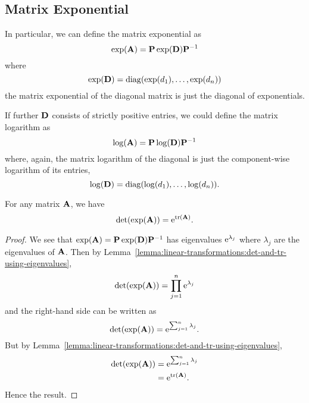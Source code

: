 \subsection{Matrix Exponential}

In particular, we can define the matrix exponential as
\begin{equation}
\exp(\mathbf{A}) = \mathbf{P}\exp(\mathbf{D})\mathbf{P}^{-1}
\end{equation}
where
\begin{equation}
\exp(\mathbf{D}) = \operatorname{diag}(\exp(d_{1}), \dots, \exp(d_{n}))
\end{equation}
the matrix exponential of the diagonal matrix is just the diagonal of
exponentials.

If further $\mathbf{D}$ consists of strictly positive entries, we could
define the matrix logarithm as
\begin{equation}
\log(\mathbf{A}) = \mathbf{P}\log(\mathbf{D})\mathbf{P}^{-1}
\end{equation}
where, again, the matrix logarithm of the diagonal is just the
component-wise logarithm of its entries,
\begin{equation}
\log(\mathbf{D}) = \operatorname{diag}(\log(d_{1}), \dots, \log(d_{n})).
\end{equation}


\begin{theorem}
  For any matrix $\mathbf{A}$, we have
  \begin{equation}
\det(\exp(\mathbf{A})) = \mathrm{e}^{\mathop{\rm tr}\nolimits(\mathbf{A})}.
  \end{equation}
\end{theorem}
\begin{proof}
We see that $\exp(\mathbf{A})=\mathbf{P}\exp(\mathbf{D})\mathbf{P}^{-1}$ has
eigenvalues $\mathrm{e}^{\lambda_{j}}$ where $\lambda_{j}$ are the eigenvalues
of $\mathbf{A}$. Then by Lemma~\ref{lemma:linear-transformations:det-and-tr-using-eigenvalues},
\begin{equation}
\det(\exp(\mathbf{A})) = \prod^{n}_{j=1}\mathrm{e}^{\lambda_{j}}
\end{equation}
and the right-hand side can be written as
\begin{equation}
\det(\exp(\mathbf{A})) = \mathrm{e}^{\sum^{n}_{j=1}\lambda_{j}}.
\end{equation}
But by Lemma~\ref{lemma:linear-transformations:det-and-tr-using-eigenvalues},
\begin{equation}
  \begin{split}
    \det(\exp(\mathbf{A})) &= \mathrm{e}^{\sum^{n}_{j=1}\lambda_{j}}\\
    &= \mathrm{e}^{\mathop{\rm tr}\nolimits(\mathbf{A})}.
  \end{split}
\end{equation}
Hence the result.
\end{proof}

